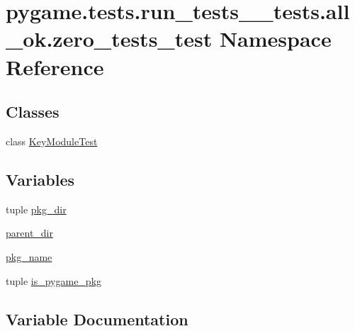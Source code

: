 \hypertarget{namespacepygame_1_1tests_1_1run__tests____tests_1_1all__ok_1_1zero__tests__test}{}\section{pygame.\+tests.\+run\+\_\+tests\+\_\+\+\_\+tests.\+all\+\_\+ok.\+zero\+\_\+tests\+\_\+test Namespace Reference}
\label{namespacepygame_1_1tests_1_1run__tests____tests_1_1all__ok_1_1zero__tests__test}
\subsection*{Classes}
\begin{DoxyCompactItemize}
\item 
class \hyperlink{classpygame_1_1tests_1_1run__tests____tests_1_1all__ok_1_1zero__tests__test_1_1_key_module_test}{Key\+Module\+Test}
\end{DoxyCompactItemize}
\subsection*{Variables}
\begin{DoxyCompactItemize}
\item 
tuple \hyperlink{namespacepygame_1_1tests_1_1run__tests____tests_1_1all__ok_1_1zero__tests__test_aa69a3f9988235753747c08a94d442e2f}{pkg\+\_\+dir}
\item 
\hyperlink{namespacepygame_1_1tests_1_1run__tests____tests_1_1all__ok_1_1zero__tests__test_a1bb273fe8cace2f4a6f9805c712c8656}{parent\+\_\+dir}
\item 
\hyperlink{namespacepygame_1_1tests_1_1run__tests____tests_1_1all__ok_1_1zero__tests__test_adee5a7d0a941d2816d8257be36a8429c}{pkg\+\_\+name}
\item 
tuple \hyperlink{namespacepygame_1_1tests_1_1run__tests____tests_1_1all__ok_1_1zero__tests__test_ad109b3829ed044a28b2371a253b71f99}{is\+\_\+pygame\+\_\+pkg}
\end{DoxyCompactItemize}


\subsection{Variable Documentation}
\mbox{\label{namespacepygame_1_1tests_1_1run__tests____tests_1_1all__ok_1_1zero__tests__test_ad109b3829ed044a28b2371a253b71f99}} 
